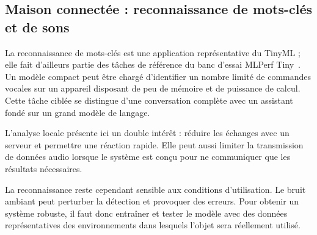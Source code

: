 \subsection{Maison connectée : reconnaissance de mots-clés et de sons}

La reconnaissance de mots-clés est une application représentative du TinyML ;
elle fait d'ailleurs partie des tâches de référence du banc d'essai MLPerf
Tiny~\cite{banbury2021mlperftiny}. Un modèle compact peut être chargé
d'identifier un nombre limité de commandes vocales sur un appareil disposant de
peu de mémoire et de puissance de calcul. Cette tâche ciblée se distingue d'une
conversation complète avec un assistant fondé sur un grand modèle de langage.

L'analyse locale présente ici un double intérêt : réduire les échanges avec un
serveur et permettre une réaction rapide. Elle peut aussi limiter la
transmission de données audio lorsque le système est conçu pour ne communiquer
que les résultats nécessaires.

La reconnaissance reste cependant sensible aux conditions d'utilisation. Le
bruit ambiant peut perturber la détection et provoquer des erreurs. Pour
obtenir un système robuste, il faut donc entraîner et tester le modèle avec des
données représentatives des environnements dans lesquels l'objet sera
réellement utilisé.

